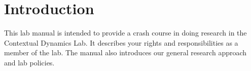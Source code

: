 \documentclass{tufte-book} %
\begin{document}




\newcommand{\director}{Jeremy}
\newcommand{\coordinator}{\director}
\newcommand{\labmeetingtime}{Thursdays at 12:30pm}
\newcommand{\meeting}{\href{https:context-lab.youcanbook.me}{YouCanBook.me}}

\cleardoublepage
\chapter{Introduction}\label{ch:intro} %
This lab manual is intended to provide a crash course in doing
research in the Contextual Dynamics Lab.  It describes your rights and
responsibilities as a member of the lab.  The manual also introduces
our general research approach and lab policies.

\end{document}
